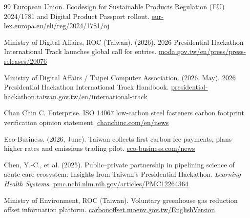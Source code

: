 \begin{thebibliography}{99}
 European Union. Ecodesign for Sustainable Products Regulation
(EU) 2024/1781 and Digital Product Passport rollout.
\href{https://eur-lex.europa.eu/eli/reg/2024/1781/oj}{eur-lex.europa.eu/eli/reg/2024/1781/oj}

 Ministry of Digital Affairs, ROC (Taiwan). (2026). 2026
Presidential Hackathon International Track launches global call for entries.
\href{https://moda.gov.tw/en/press/press-releases/20076}{moda.gov.tw/en/press/press-releases/20076}

 Ministry of Digital Affairs / Taipei Computer Association.
(2026, May). 2026 Presidential Hackathon International Track Handbook.
\href{https://presidential-hackathon.taiwan.gov.tw/en/international-track/}{presidential-hackathon.taiwan.gov.tw/en/international-track}

 Chan Chin C. Enterprise. ISO 14067 low-carbon steel
fasteners carbon footprint verification opinion statement.
\href{https://www.chanchinc.com/en/news/Taiwan-based_screw_manufacturer_05.html}{chanchinc.com/en/news}

 Eco-Business. (2026, June). Taiwan collects first carbon fee
payments, plans higher rates and emissions trading pilot.
\href{https://www.eco-business.com/news/taiwan-collects-first-carbon-fee-payments-plans-higher-rates-and-emissions-trading-pilot/}{eco-business.com/news}

 Chen, Y.-C., et al. (2025). Public--private partnership in
pipelining science of acute care ecosystem: Insights from Taiwan's Presidential
Hackathon. \emph{Learning Health Systems}.
\href{https://pmc.ncbi.nlm.nih.gov/articles/PMC12264364/}{pmc.ncbi.nlm.nih.gov/articles/PMC12264364}

 Ministry of Environment, ROC (Taiwan). Voluntary greenhouse
gas reduction offset information platform.
\href{https://carbonoffset.moenv.gov.tw/EnglishVersion}{carbonoffset.moenv.gov.tw/EnglishVersion}

\end{thebibliography}
